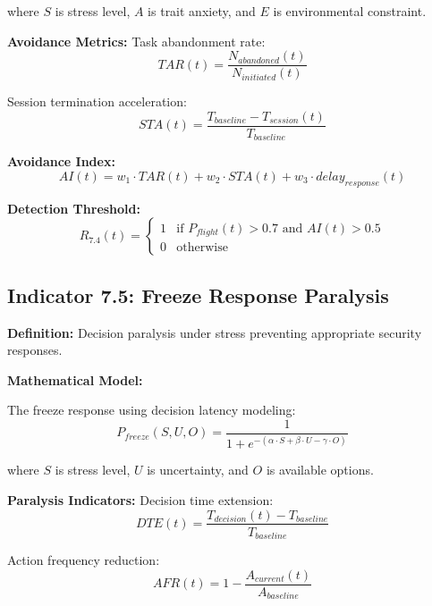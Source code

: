 \documentclass[11pt,a4paper]{article}
\begin{document}
where $S$ is stress level, $A$ is trait anxiety, and $E$ is environmental constraint.

\textbf{Avoidance Metrics:}
Task abandonment rate:
\begin{equation}
TAR(t) = \frac{N_{abandoned}(t)}{N_{initiated}(t)}
\end{equation}

Session termination acceleration:
\begin{equation}
STA(t) = \frac{T_{baseline} - T_{session}(t)}{T_{baseline}}
\end{equation}

\textbf{Avoidance Index:}
\begin{equation}
AI(t) = w_1 \cdot TAR(t) + w_2 \cdot STA(t) + w_3 \cdot delay_{response}(t)
\end{equation}

\textbf{Detection Threshold:}
\begin{equation}
R_{7.4}(t) = \begin{cases}
1 & \text{if } P_{flight}(t) > 0.7 \text{ and } AI(t) > 0.5 \\
0 & \text{otherwise}
\end{cases}
\end{equation}

\subsection{Indicator 7.5: Freeze Response Paralysis}

\textbf{Definition:} Decision paralysis under stress preventing appropriate security responses.

\textbf{Mathematical Model:}

The freeze response using decision latency modeling:
\begin{equation}
P_{freeze}(S,U,O) = \frac{1}{1 + e^{-(\alpha \cdot S + \beta \cdot U - \gamma \cdot O)}}
\end{equation}

where $S$ is stress level, $U$ is uncertainty, and $O$ is available options.

\textbf{Paralysis Indicators:}
Decision time extension:
\begin{equation}
DTE(t) = \frac{T_{decision}(t) - T_{baseline}}{T_{baseline}}
\end{equation}

Action frequency reduction:
\begin{equation}
AFR(t) = 1 - \frac{A_{current}(t)}{A_{baseline}}
\end{equation}
\end{document}

